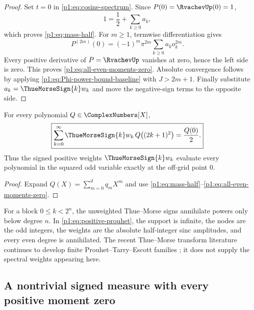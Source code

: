 \documentclass[11pt,oneside]{article}
\theoremstyle{definition}
\theoremstyle{remark}
\begin{document}
\begin{proof}
Set $t=0$ in \eqref{p1:eq:cosine-spectrum}.  Since $P(0)=\RvachevUp(0)=1$,
\[
 1=\frac12+\sum_{k\ge0}a_k,
\]
which proves \eqref{p1:eq:mass-half}.  For $m\ge1$, termwise differentiation gives
\[
 P^{(2m)}(0)=(-1)^m\pi^{2m}
 \sum_{k\ge0}a_ko_k^{2m}.
\]
Every positive derivative of $P=\RvachevUp$ vanishes at zero, hence the left side is
zero.  This proves \eqref{p1:eq:all-even-moments-zero}.  Absolute convergence
follows by applying \eqref{p1:eq:Phi-power-bound-baseline} with $J>2m+1$.
Finally substitute $a_k=\ThueMorseSign{k}w_k$ and move the negative-sign terms to the
opposite side.
\end{proof}

\begin{corollary}\label{p1:cor:spectral-quadrature}
For every polynomial $Q\in\ComplexNumbers[X]$,
\begin{equation}\label{p1:eq:polynomial-quadrature}
 \boxed{
 \sum_{k=0}^{\infty}\ThueMorseSign{k}w_k\,Q\bigl((2k+1)^2\bigr)
 =\frac{Q(0)}2.}
\end{equation}
Thus the signed positive weights $\ThueMorseSign{k}w_k$ evaluate every polynomial in the
squared odd variable exactly at the off-grid point $0$.
\end{corollary}

\begin{proof}
Expand $Q(X)=\sum_{m=0}^d q_mX^m$ and use
\eqref{p1:eq:mass-half}--\eqref{p1:eq:all-even-moments-zero}.
\end{proof}

\begin{remark}
For a block $0\le k<2^n$, the unweighted Thue--Morse signs annihilate powers
only below degree $n$.  In \eqref{p1:eq:positive-prouhet}, the support is infinite,
the nodes are the odd integers, the weights are the absolute half-integer sinc
amplitudes, and every even degree is annihilated.  The recent Thue--Morse
transform literature continues to develop finite Prouhet--Tarry--Escott
families \cite{p1:cloitre2026}; it does not supply the spectral weights appearing
here.
\end{remark}

\subsection{A nontrivial signed measure with every positive moment zero}
\end{document}

